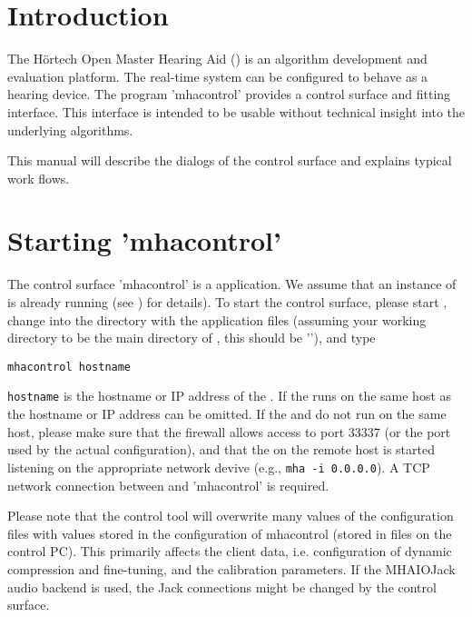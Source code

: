 \documentclass[11pt,a4paper,twoside]{article}
\newcommand{\+}{\discretionary{\mbox{\scriptsize$\hookleftarrow$}}{}{}}
\begin{document}
\newpage
\MHAcopyright{}
\newpage
\tableofcontents
\newpage
\renewcommand{\leftmark}{\rightmark}


\section{Introduction}

The H\"{o}rtech Open Master Hearing Aid (\mha{}) is an algorithm 
development and evaluation platform.
%
The real-time system can be configured to behave as a hearing device.
%
The program 'mhacontrol' provides a control surface and fitting
interface.
%
This interface is intended to be usable without technical insight into
the underlying algorithms.

This manual will describe the dialogs of the control surface and
explains typical work flows.

\section{Starting 'mhacontrol'}

The control surface 'mhacontrol' is a \Matlab{}
application.
%
We assume that an instance of \mha{} is already running (see \EngineerManual) for 
details). To start the control surface, please start \Matlab{}, change into the 
directory with the application files (assuming your working directory to be the 
main directory of \mha{}, this should be '\MatlabDir{}'), and type
%
\begin{verbatim}
mhacontrol hostname
\end{verbatim}
%
\verb!hostname! is the hostname or IP address of the \mha{}.
%
If the \mha{} runs on the same host as \Matlab{} the hostname or IP address
can be omitted.
%
If the \mha{} and \Matlab{} do not run on the same host, please make sure
that the firewall allows access to port
33337 (or the port used by the actual \mha{} configuration), and that the
\mha{} on the remote host is started listening on the appropriate network
devive (e.g., \verb!mha -i 0.0.0.0!).
%
A TCP network connection between \mha{} and 'mhacontrol' is required.

Please note that the control tool will overwrite many values of the
\mha{} configuration files with values stored in the configuration of
mhacontrol (stored in \Matlab{} files on the control PC).
%
This primarily affects the client data, i.e. configuration of dynamic
compression and fine-tuning, and the calibration parameters.
%
If the MHAIOJack audio backend is used, the Jack connections might be
changed by the control surface.
\end{document}
